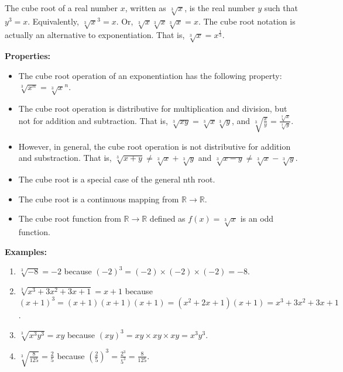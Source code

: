 \documentclass[12pt]{article}
\begin{document}

The cube root of a real number $x$, written as $\sqrt[3]{x}$, is the real number $y$ such that $y^3 = x$.
Equivalently, $\sqrt[3]{x}^3 = x$.  Or, $\sqrt[3]{x}\sqrt[3]{x}\sqrt[3]{x} = x$. The cube root notation is actually an alternative to exponentiation.  That is, $\sqrt[3]{x} = x^\frac{1}{3}$.  

\textbf{Properties:}
\begin{itemize}
\item The cube root operation of an exponentiation has the following property:  $\sqrt[3]{x^n} = \sqrt[3]{x}^n$.
\item The cube root operation is distributive for multiplication and division, but not for addition and subtraction. That is, $\sqrt[3]{xy} = \sqrt[3]{x} \sqrt[3]{y}$, and $\sqrt[3]{\frac{x}{y}} = \frac{\sqrt[3]{x}}{\sqrt[3]{y}}$.

\item  However, in general, the cube root operation is not distributive for addition and substraction.  That is, $\sqrt[3]{x + y} \not= \sqrt[3]{x} + \sqrt[3]{y}$ and $\sqrt[3]{x - y} \not= \sqrt[3]{x} - \sqrt[3]{y}$.

\item The cube root is a special case of the general nth root.

\item The cube root is a continuous mapping from $\mathbb{R} \to \mathbb{R}$.

\item The cube root function from $\mathbb{R} \to \mathbb{R}$ defined as $f(x)=\sqrt[3]{x}$ is an odd function.

\end{itemize}

\textbf{Examples:}
\begin{enumerate}
\item $\sqrt[3]{-8} = -2$ because $(-2)^3 = (-2) \times (-2) \times (-2) = -8$.
\item $\sqrt[3]{x^3 + 3x^2 + 3x + 1} = x + 1$ because
$(x + 1)^3 = (x + 1)(x + 1)(x + 1) = (x^2 + 2x + 1)(x + 1) = x^3 + 3x^2 + 3x + 1$.
\item $\sqrt[3]{x^{3}y^{3}} = xy$ because
$(xy)^3 = xy \times xy \times xy = x^{3}y^{3}$.
\item $\sqrt[3]{\frac{8}{125}} = \frac{2}{5}$ because $(\frac{2}{5})^3 = \frac{2^3}{5^3} = \frac{8}{125}$.
\end{enumerate}
\end{document}
